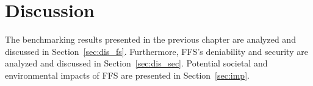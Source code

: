 
\chapter{Discussion}
\label{ch:discussion}
The benchmarking results presented in the previous chapter are analyzed and discussed in Section~\ref{sec:dis_fs}. Furthermore, \gls{FFS}'s deniability and security are analyzed and discussed in Section~\ref{sec:dis_sec}. Potential societal and environmental impacts of \gls{FFS} are presented in Section~\ref{sec:imp}.




